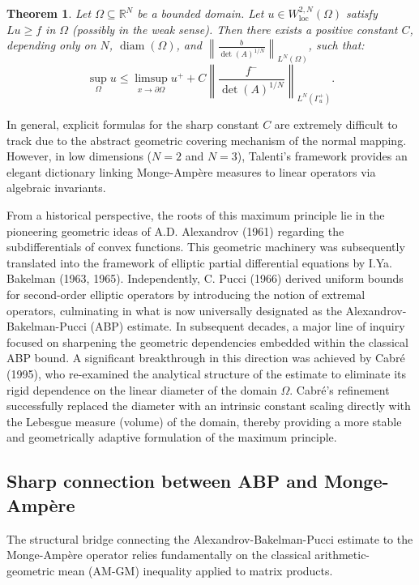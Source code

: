 \documentclass{article}
\newtheorem{theorem}{Theorem}[section]
\numberwithin{equation}{section}
\begin{document}
\begin{theorem}
Let $\Omega \subseteq \mathbb{R}^N$ be a bounded domain. Let $u \in W^{2,N}_{\text{loc}}(\Omega)$ satisfy $Lu \ge f$ in $\Omega$ (possibly in the weak sense). Then there exists a positive constant $C$, depending only on $N$, $\operatorname{diam}(\Omega)$, and $\left\|\frac{b}{\det(A)^{1/N}}\right\|_{L^N(\Omega)}$, such that:
\[
\sup_\Omega u \le \limsup_{x \to \partial\Omega} u^+ + C \left\| \frac{f^-}{\det(A)^{1/N}} \right\|_{L^N(\Gamma^+_u)}.
\]
\end{theorem}

\noindent In general, explicit formulas for the sharp constant $C$ are extremely difficult to track due to the abstract geometric covering mechanism of the normal mapping. However, in low dimensions ($N=2$ and $N=3$), Talenti's framework provides an elegant dictionary linking Monge-Ampère measures to linear operators via algebraic invariants.

\noindent From a historical perspective, the roots of this maximum principle lie in the pioneering geometric ideas of A.D. Alexandrov (1961) regarding the subdifferentials of convex functions. This geometric machinery was subsequently translated into the framework of elliptic partial differential equations by I.Ya. Bakelman (1963, 1965). Independently, C. Pucci (1966) derived uniform bounds for second-order elliptic operators by introducing the notion of extremal operators, culminating in what is now universally designated as the Alexandrov-Bakelman-Pucci (ABP) estimate. In subsequent decades, a major line of inquiry focused on sharpening the geometric dependencies embedded within the classical ABP bound. A significant breakthrough in this direction was achieved by Cabré (1995), who re-examined the analytical structure of the estimate to eliminate its rigid dependence on the linear diameter of the domain $\Omega$. Cabré's refinement successfully replaced the diameter with an intrinsic constant scaling directly with the Lebesgue measure (volume) of the domain, thereby providing a more stable and geometrically adaptive formulation of the maximum principle.

\subsection{Sharp connection between ABP and Monge-Ampère}

The structural bridge connecting the Alexandrov-Bakelman-Pucci estimate to the Monge-Ampère operator relies fundamentally on the classical arithmetic-geometric mean (AM-GM) inequality applied to matrix products.
\end{document}
